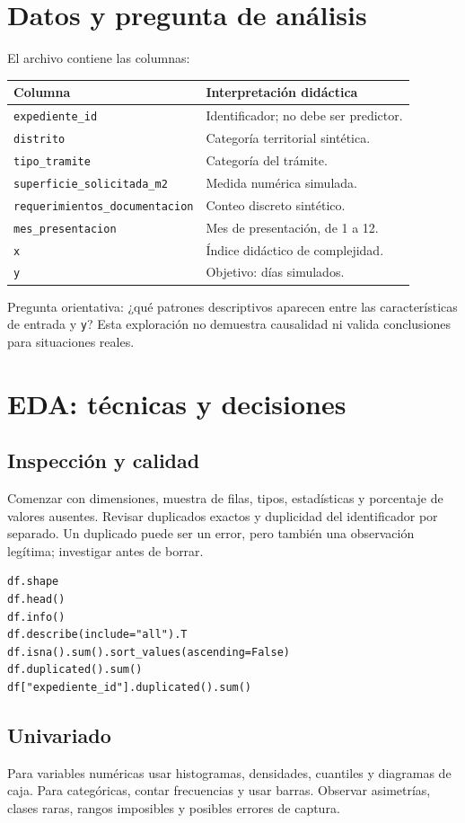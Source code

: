 \documentclass[11pt,a4paper]{article}
\begin{document}
\section{Datos y pregunta de análisis}
El archivo contiene las columnas:
\begin{longtable}{@{}ll@{}}
\toprule
Columna & Interpretación didáctica\\\midrule
\texttt{expediente\_id} & Identificador; no debe ser predictor.\\
\texttt{distrito} & Categoría territorial sintética.\\
\texttt{tipo\_tramite} & Categoría del trámite.\\
\texttt{superficie\_solicitada\_m2} & Medida numérica simulada.\\
\texttt{requerimientos\_documentacion} & Conteo discreto sintético.\\
\texttt{mes\_presentacion} & Mes de presentación, de 1 a 12.\\
\texttt{x} & Índice didáctico de complejidad.\\
\texttt{y} & Objetivo: días simulados.\\\bottomrule
\end{longtable}
Pregunta orientativa: ¿qué patrones descriptivos aparecen entre las características de entrada y \texttt{y}? Esta exploración no demuestra causalidad ni valida conclusiones para situaciones reales.
\section{EDA: técnicas y decisiones}
\subsection{Inspección y calidad}
Comenzar con dimensiones, muestra de filas, tipos, estadísticas y porcentaje de valores ausentes. Revisar duplicados exactos y duplicidad del identificador por separado. Un duplicado puede ser un error, pero también una observación legítima; investigar antes de borrar.
\begin{lstlisting}[style=python]
df.shape
df.head()
df.info()
df.describe(include="all").T
df.isna().sum().sort_values(ascending=False)
df.duplicated().sum()
df["expediente_id"].duplicated().sum()
\end{lstlisting}
\subsection{Univariado}
Para variables numéricas usar histogramas, densidades, cuantiles y diagramas de caja. Para categóricas, contar frecuencias y usar barras. Observar asimetrías, clases raras, rangos imposibles y posibles errores de captura.
\end{document}
